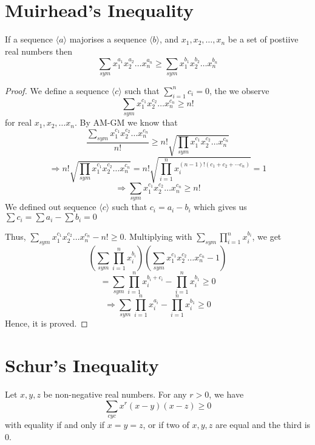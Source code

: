 \section{Muirhead's Inequality}
\begin{theorem}
  If a sequence $\langle a\rangle$ majorises a sequence $\langle b\rangle$, and $x_1, x_2, \ldots, x_n$ be a set of postiive real
  numbers then
  \begin{equation}
    \sum_{sym}x_1^{a_1}x_2^{a_2}\ldots x_n^{a_n}\geq \sum_{sym}x_1^{b_1}x_2^{b_2}\ldots x_n^{b_n}
  \end{equation}
\end{theorem}

\begin{proof}
  We define a sequence $\langle c\rangle$ such that $\sum_{i=1}^nc_i = 0$, the we observe
  $$\sum_{sym}x_1^{c_1}x_2^{c_2}\ldots x_n^{c_n}\geq n!$$
  for real $x_1, x_2, \ldots x_n$.
  By AM-GM we know that
  $$\frac{\sum_{sym}x_1^{c_1}x_2^{c_2}\ldots x_n^{c_n}}{n!}\geq n!\sqrt{\prod_{sym}x_1^{c_1}x_2^{c_2}\ldots x_n^{c_n}}$$
  $$\Rightarrow n!\sqrt{\prod_{sym}x_1^{c_1}x_2^{c_2}\ldots x_n^{c_n}} = n!\sqrt{\prod_{i=1}^nx_i^{(n-1)!(c_1 + c_2 + \cdots
      c_n)}} = 1$$
  $$\Rightarrow \sum_{sym}x_1^{c_1}x_2^{c_2}\ldots x_n^{c_n} \geq n!$$
  We defined out sequence $\langle c\rangle$ such that $c_i = a_ i - b_i$ which gives us $\sum c_i = \sum a_i - \sum b_i = 0$

  \noindent Thus, $\sum_{sym}x_1^{c_1}x_2^{c_2}\ldots x_n^{c_n} - n! \geq 0.$
  Multiplying with $\sum_{sym}\prod_{i=1}^nx_i^{b_i}$, we get
  $$\left(\sum_{sym}\prod_{i=1}^nx_i^{b_i}\right)\left(\sum_{sym}x_1^{c_1}x_2^{c_2}\ldots x_n^{c_n} - 1\right)$$
  $$= \sum_{sym}\prod_{i=1}^nx_i^{b_i + c_i} - \prod_{i=1}^nx_i^{b_1}\geq 0$$
  $$\Rightarrow \sum_{sym}\prod_{i=1}^nx_i^{a_i} - \prod_{i=1}^nx_i^{b_1}\geq 0$$
  Hence, it is proved.
\end{proof}

\section{Schur's Inequality}
\begin{theorem}
  Let $x, y, z$ be non-negative real numbers. For any $r > 0$, we have
  \begin{equation}
    \sum_{cyc}x^r(x - y)(x - z) \geq 0
  \end{equation}
  with equality if and only if $x = y = z$, or if two of $x, y, z$ are equal and the third is $0$.
\end{theorem}

